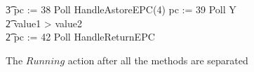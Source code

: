 \begin{figure}[p!]
\begin{circus}
    \t3 pc := 38 \circseq Poll \circseq HandleAstoreEPC(4) \circseq pc := 39 \circseq Poll \circseq Y \\
    \t2 {} \circelse value1 > value2 \circthen \Skip \\
    \t2 \circfi \circseq pc := 42 \circseq Poll \circseq HandleReturnEPC
  \end{circus}
  \caption{The $Running$ action after all the methods are separated}
  \label{final-method-separation-example-figure}
\end{figure}


